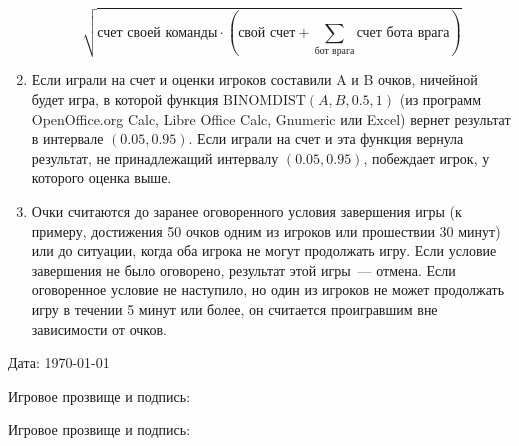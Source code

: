 \documentclass[a4paper,titlepage,12pt]{article}
\begin{document}
\begin{enumerate}
    $$ \sqrt{\text{счет своей команды} \cdot (\text{свой счет} +
        \sum\limits_{\text{бот врага}}\text{счет бота врага})} $$

\item Если играли на счет и оценки игроков составили A и B очков,
    ничейной будет игра, в которой функция
    $ \text{BINOMDIST}(A, B, 0.5, 1) $ (из программ
    OpenOffice.org Calc, Libre Office Calc, Gnumeric или Excel)
    вернет результат в интервале $ (0.05, 0.95) $.
    Если играли на счет и эта функция вернула результат, не принадлежащий
    интервалу $ (0.05, 0.95) $, побеждает игрок, у которого оценка выше.
\item Очки считаются до заранее оговоренного условия завершения игры
    (к примеру, достижения 50 очков одним из игроков или прошествии 30 минут)
    или до ситуации, когда оба игрока не могут продолжать игру.
    Если условие завершения не было оговорено,
    результат этой игры~--- отмена.
    Если оговоренное условие не наступило, но один из игроков не может
    продолжать игру в течении 5 минут или более, он считается проигравшим
    вне зависимости от очков.

\end{enumerate}

Дата: \today

Игровое прозвище и подпись:

Игровое прозвище и подпись:
\end{document}
